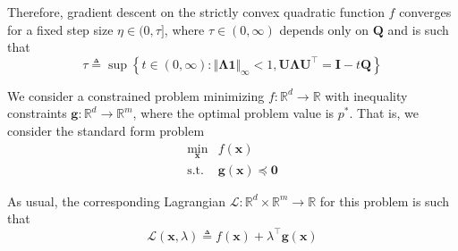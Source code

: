 \documentclass{article}
\numberwithin{equation}{section}
\begin{document}
\begin{enumerate}[label=\alph*.]
    \medskip

    Therefore, gradient descent on the strictly convex quadratic function
    $ f $ converges for a fixed step size $ \eta \in (0, \tau] $, where
    $ \tau \in (0, \infty) $ depends only on $ \mathbf{Q} $ and is such that
    \begin{equation*}
        \tau \triangleq
        \sup\left\{
            t \in (0, \infty) : \Vert\mathbf{\Lambda 1}\Vert_\infty < 1,
            \mathbf{U\Lambda U}^\top = \mathbf{I} - t\mathbf{Q}
        \right\}
    \end{equation*}
\end{enumerate}


We consider a constrained problem minimizing
$ f : \mathbb{R}^d \rightarrow \mathbb{R} $ with inequality constraints
$ \mathbf{g} : \mathbb{R}^d \rightarrow \mathbb{R}^m $, where the optimal
problem value is $ p^* $. That is, we consider the standard form problem
\begin{equation} \label{eq:5.2.1}
    \begin{array}{rl}
        \displaystyle\min_\mathbf{x} & f(\mathbf{x}) \\
        \text{s.t.} & \mathbf{g}(\mathbf{x}) \preceq \mathbf{0}
    \end{array}
\end{equation}

As usual, the corresponding Lagrangian
$ \mathcal{L} : \mathbb{R}^d \times \mathbb{R}^m \rightarrow \mathbb{R} $ for
this problem is such that
\begin{equation} \label{eq:5.2.2}
    \mathcal{L}(\mathbf{x}, \lambda) \triangleq
    f(\mathbf{x}) + \lambda^\top \mathbf{g}(\mathbf{x})
\end{equation}
\end{document}
